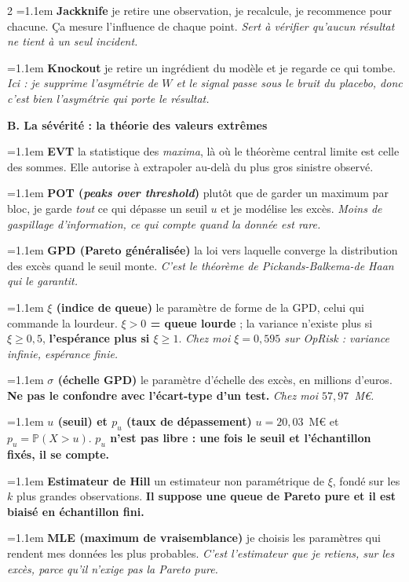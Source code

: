 \documentclass[9pt,a4paper]{article}
\newcommand{\n}[1]{\textbf{#1}}
\newcommand{\dfn}[2]{\noindent\hangindent=1.1em\hangafter=1
  {\color{warm}\bfseries #1} \textemdash{} #2\par\smallskip}
\begin{document}
\begin{multicols}{2}
\dfn{Jackknife}{je retire une observation, je recalcule, je recommence pour chacune. Ça
mesure l'influence de chaque point. \emph{Sert à vérifier qu'aucun résultat ne tient à un
seul incident.}}

\dfn{Knockout}{je retire un ingrédient du modèle et je regarde ce qui tombe. \emph{Ici : je
supprime l'asymétrie de $W$ et le signal passe sous le bruit du placebo, donc c'est bien
l'asymétrie qui porte le résultat.}}

\vspace{3pt}
{\color{navy}\bfseries B. La sévérité : la théorie des valeurs extrêmes}

\dfn{EVT}{la statistique des \emph{maxima}, là où le théorème central limite est celle des
sommes. Elle autorise à extrapoler au-delà du plus gros sinistre observé.}

\dfn{POT (\emph{peaks over threshold})}{plutôt que de garder un maximum par bloc, je garde
\emph{tout} ce qui dépasse un seuil $u$ et je modélise les excès. \emph{Moins de gaspillage
d'information, ce qui compte quand la donnée est rare.}}

\dfn{GPD (Pareto généralisée)}{la loi vers laquelle converge la distribution des excès quand
le seuil monte. \emph{C'est le théorème de Pickands-Balkema-de Haan qui le garantit.}}

\dfn{$\xi$ (indice de queue)}{le paramètre de forme de la GPD, celui qui commande la
lourdeur. \n{$\xi>0$ = queue lourde} ; la variance n'existe plus si $\xi\ge0{,}5$,
\n{l'espérance plus si $\xi\ge1$}. \emph{Chez moi $\xi=0{,}595$ sur OpRisk : variance
infinie, espérance finie.}}

\dfn{$\sigma$ (échelle GPD)}{le paramètre d'échelle des excès, en millions d'euros. \n{Ne pas
le confondre avec l'écart-type d'un test.} \emph{Chez moi $57{,}97$~M\euro.}}

\dfn{$u$ (seuil) et $p_u$ (taux de dépassement)}{$u=20{,}03$~M\euro{} et $p_u=\mathbb{P}(X>u)$.
\n{$p_u$ n'est pas libre : une fois le seuil et l'échantillon fixés, il se compte.}}

\dfn{Estimateur de Hill}{un estimateur non paramétrique de $\xi$, fondé sur les $k$ plus
grandes observations. \n{Il suppose une queue de Pareto pure et il est biaisé en échantillon
fini.}}

\dfn{MLE (maximum de vraisemblance)}{je choisis les paramètres qui rendent mes données les
plus probables. \emph{C'est l'estimateur que je retiens, sur les excès, parce qu'il n'exige
pas la Pareto pure.}}


\end{multicols}
\end{document}
